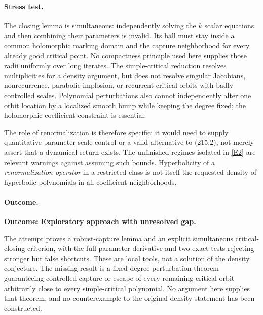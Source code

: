 \documentclass[11pt,a4paper]{article}
\newcommand{\eref}[2]{\hyperlink{extra:#1:#2}{[E#2]}}
\begin{document}
\paragraph{Stress test.}
The closing lemma is simultaneous: independently solving the $k$ scalar
equations and then combining their parameters is invalid. Its ball must
stay inside a common holomorphic marking domain and the capture
neighborhood for every already good critical point. No compactness
principle used here supplies those radii uniformly over long iterates.
The simple-critical reduction resolves multiplicities for a density
argument, but does not resolve singular Jacobians, nonrecurrence,
parabolic implosion, or recurrent critical orbits with badly controlled
scales. Polynomial perturbations also cannot independently alter one
orbit location by a localized smooth bump while keeping the degree fixed;
the holomorphic coefficient constraint is essential.

The role of renormalization is therefore specific: it would need to
supply quantitative parameter-scale control or a valid alternative to
(215.2), not merely assert that a dynamical return exists. The unfinished
regimes isolated in \eref{215}{2} are relevant warnings against assuming
such bounds. Hyperbolicity of a \emph{renormalization operator} in a
restricted class is not itself the requested density of hyperbolic
polynomials in all coefficient neighborhoods.

\paragraph{Outcome.}
\textbf{Outcome: Exploratory approach with unresolved gap.}

The attempt proves a robust-capture lemma and an explicit simultaneous
critical-closing criterion, with the full parameter derivative and two
exact tests rejecting stronger but false shortcuts. These are local tools,
not a solution of the density conjecture. The missing result is a
fixed-degree perturbation theorem guaranteeing controlled capture or
escape of every remaining critical orbit arbitrarily close to every
simple-critical polynomial. No argument here supplies that theorem, and
no counterexample to the original density statement has been constructed.
\end{document}
